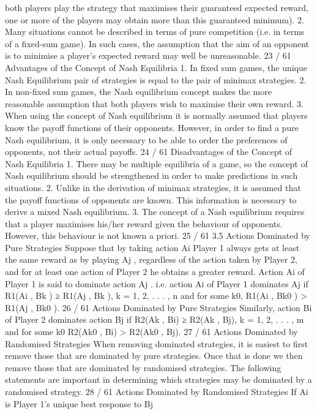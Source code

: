 both players play the strategy that maximises their
guaranteed expected reward, one or more of the
players may obtain more than this guaranteed
minimum).
2. Many situations cannot be described in terms of pure
competition (i.e. in terms of a fixed-sum game). In
such cases, the assumption that the aim of an
opponent is to minimise a player’s expected reward
may well be unreasonable.
23 / 61
Advantages of the Concept of Nash Equilibria
1. In fixed sum games, the unique Nash Equilibrium pair
of strategies is equal to the pair of minimax
strategies.
2. In non-fixed sum games, the Nash equilibrium
concept makes the more reasonable assumption that
both players wish to maximise their own reward.
3. When using the concept of Nash equilibrium it is
normally assumed that players know the payoff
functions of their opponents. However, in order to
find a pure Nash equilibrium, it is only necessary to
be able to order the preferences of opponents, not
their actual payoffs.
24 / 61
Disadvantages of the Concept of Nash Equilibria
1. There may be multiple equilibria of a game, so the
concept of Nash equilibrium should be strengthened
in order to make predictions in such situations.
2. Unlike in the derivation of minimax strategies, it is
assumed that the payoff functions of opponents are
known. This information is necessary to derive a
mixed Nash equilibrium.
3. The concept of a Nash equilibrium requires that a
player maximises his/her reward given the behaviour
of opponents. However, this behaviour is not known
a priori.
25 / 61
3.5 Actions Dominated by Pure Strategies
Suppose that by taking action Ai Player 1 always gets at least the
same reward as by playing Aj
, regardless of the action taken by
Player 2, and for at least one action of Player 2 he obtains a
greater reward. Action Ai of Player 1 is said to dominate action Aj
.
i.e. action Ai of Player 1 dominates Aj
if
R1(Ai
, Bk ) ≥ R1(Aj
, Bk ), k = 1, 2, . . . , n
and for some k0, R1(Ai
, Bk0
) > R1(Aj
, Bk0
).
26 / 61
Actions Dominated by Pure Strategies
Similarly, action Bi of Player 2 dominates action Bj
if
R2(Ak , Bi) ≥ R2(Ak , Bj), k = 1, 2, . . . , m
and for some k0
R2(Ak0
, Bi) > R2(Ak0
, Bj).
27 / 61
Actions Dominated by Randomised Strategies
When removing dominated strategies, it is easiest to first remove
those that are dominated by pure strategies.
Once that is done we then remove those that are dominated by
randomised strategies.
The following statements are important in determining which
strategies may be dominated by a randomised strategy.
28 / 61
Actions Dominated by Randomised Strategies
If Ai
is Player 1’s unique best response to Bj
